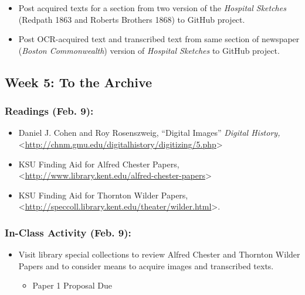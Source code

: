 \documentclass[]{article}
\begin{document}
\begin{itemize}
\itemsep1pt\parskip0pt
\item
  Post acquired texts for a section from two version of the
  \emph{Hospital Sketches} (Redpath 1863 and Roberts Brothers 1868) to
  GitHub project.
\item
  Post OCR-acquired text and transcribed text from same section of
  newspaper (\emph{Boston Commonwealth}) version of \emph{Hospital
  Sketches} to GitHub project.
\end{itemize}

\subsection{Week 5: To the Archive}\label{week-5-to-the-archive}

\subsubsection{Readings (Feb. 9):}\label{readings-feb.-9}

\begin{itemize}
\itemsep1pt\parskip0pt
\item
  Daniel J. Cohen and Roy Rosenszweig, ``Digital Images'' \emph{Digital
  History,}
  \textless{}\url{http://chnm.gmu.edu/digitalhistory/digitizing/5.php}\textgreater{}
\item
  KSU Finding Aid for Alfred Chester Papers,
  \textless{}\url{http://www.library.kent.edu/alfred-chester-papers}\textgreater{}
\item
  KSU Finding Aid for Thornton Wilder Papers,
  \textless{}\url{http://speccoll.library.kent.edu/theater/wilder.html}\textgreater{}.
\end{itemize}

\subsubsection{In-Class Activity (Feb.
9):}\label{in-class-activity-feb.-9}

\begin{itemize}
\itemsep1pt\parskip0pt
\item
  Visit library special collections to review Alfred Chester and
  Thornton Wilder Papers and to consider means to acquire images and
  transcribed texts.

  \begin{itemize}
  \itemsep1pt\parskip0pt
  \item
    Paper 1 Proposal Due
  \end{itemize}
\end{itemize}
\end{document}
